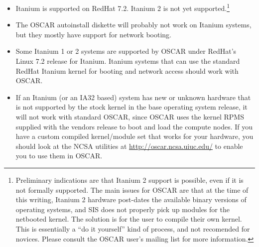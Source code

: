 \begin{itemize}
  
\item Itanium is supported on RedHat 7.2.  Itanium 2 is not yet
  supported.\footnote{Preliminary indications are that Itanium 2
    support is possible, even if it is not formally supported.  The
    main issues for OSCAR are that at the time of this writing,
    Itanium 2 hardware post-dates the available binary versions of
    operating systems, and SIS does not properly pick up modules for
    the netbooted kernel.  The solution is for the user to compile
    their own kernel.  This is essentially a ``do it yourself'' kind
    of process, and not recomended for novices.  Please consult the
    OSCAR user's mailing list for more information.}

\item The OSCAR autoinstall diskette will probably not work on Itanium
  systems, but they mostly have support for network booting.
  
\item Some Itanium 1 or 2 systems are supported by OSCAR under
  RedHat's Linux 7.2 release for Itanium.  Itanium systems that can
  use the standard RedHat Itanium kernel for booting and network
  access should work with OSCAR.
  
\item If an Itanium (or an IA32 based) system has new or unknown
  hardware that is not supported by the stock kernel in the base
  operating system release, it will not work with standard OSCAR,
  since OSCAR uses the kernel RPMS supplied with the vendors release
  to boot and load the compute nodes.  If you have a custom compiled
  kernel/module set that works for your hardware, you should look at
  the NCSA utilities at \url{http://oscar.ncsa.uiuc.edu/} to
  enable you to use them in OSCAR.
\end{itemize}





